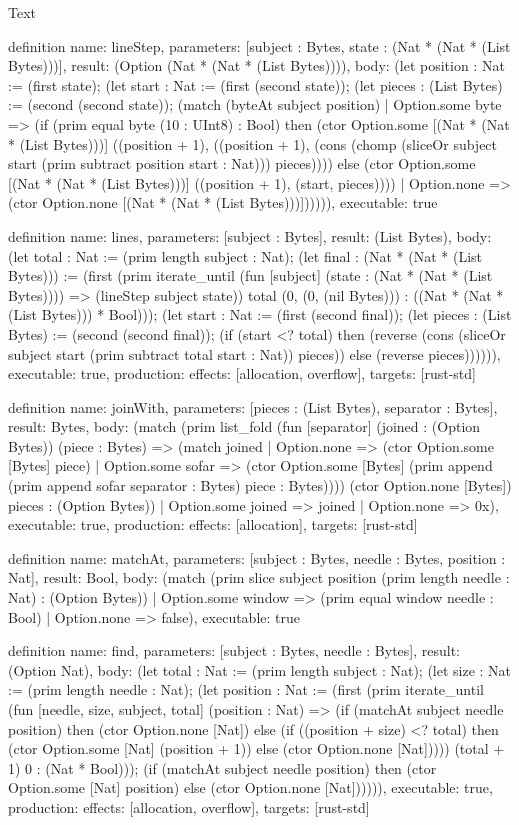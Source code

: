 \begin{lexlean}{Text}
\begin{semanticmodule}
definition{
  name: lineStep,
  parameters: [subject : Bytes, state : (Nat * (Nat * (List Bytes)))],
  result: (Option (Nat * (Nat * (List Bytes)))),
  body: (let position : Nat := (first state); (let start : Nat := (first (second state)); (let pieces : (List Bytes) := (second (second state)); (match (byteAt subject position)
    | Option.some byte => (if (prim equal byte (10 : UInt8) : Bool) then (ctor Option.some [(Nat * (Nat * (List Bytes)))] ((position + 1), ((position + 1), (cons (chomp (sliceOr subject start (prim subtract position start : Nat))) pieces)))) else (ctor Option.some [(Nat * (Nat * (List Bytes)))] ((position + 1), (start, pieces))))
    | Option.none => (ctor Option.none [(Nat * (Nat * (List Bytes)))]))))),
  executable: true
}

definition{
  name: lines,
  parameters: [subject : Bytes],
  result: (List Bytes),
  body: (let total : Nat := (prim length subject : Nat); (let final : (Nat * (Nat * (List Bytes))) := (first (prim iterate_until (fun [subject] (state : (Nat * (Nat * (List Bytes)))) => (lineStep subject state)) total (0, (0, (nil Bytes))) : ((Nat * (Nat * (List Bytes))) * Bool))); (let start : Nat := (first (second final)); (let pieces : (List Bytes) := (second (second final)); (if (start <? total) then (reverse (cons (sliceOr subject start (prim subtract total start : Nat)) pieces)) else (reverse pieces)))))),
  executable: true,
  production: {effects: [allocation, overflow], targets: [rust-std]}
}

definition{
  name: joinWith,
  parameters: [pieces : (List Bytes), separator : Bytes],
  result: Bytes,
  body: (match (prim list_fold (fun [separator] (joined : (Option Bytes)) (piece : Bytes) => (match joined
      | Option.none => (ctor Option.some [Bytes] piece)
      | Option.some sofar => (ctor Option.some [Bytes] (prim append (prim append sofar separator : Bytes) piece : Bytes)))) (ctor Option.none [Bytes]) pieces : (Option Bytes))
    | Option.some joined => joined
    | Option.none => 0x),
  executable: true,
  production: {effects: [allocation], targets: [rust-std]}
}

definition{
  name: matchAt,
  parameters: [subject : Bytes, needle : Bytes, position : Nat],
  result: Bool,
  body: (match (prim slice subject position (prim length needle : Nat) : (Option Bytes))
    | Option.some window => (prim equal window needle : Bool)
    | Option.none => false),
  executable: true
}

definition{
  name: find,
  parameters: [subject : Bytes, needle : Bytes],
  result: (Option Nat),
  body: (let total : Nat := (prim length subject : Nat); (let size : Nat := (prim length needle : Nat); (let position : Nat := (first (prim iterate_until (fun [needle, size, subject, total] (position : Nat) => (if (matchAt subject needle position) then (ctor Option.none [Nat]) else (if ((position + size) <? total) then (ctor Option.some [Nat] (position + 1)) else (ctor Option.none [Nat])))) (total + 1) 0 : (Nat * Bool))); (if (matchAt subject needle position) then (ctor Option.some [Nat] position) else (ctor Option.none [Nat]))))),
  executable: true,
  production: {effects: [allocation, overflow], targets: [rust-std]}
}
\end{semanticmodule}
\end{lexlean}
